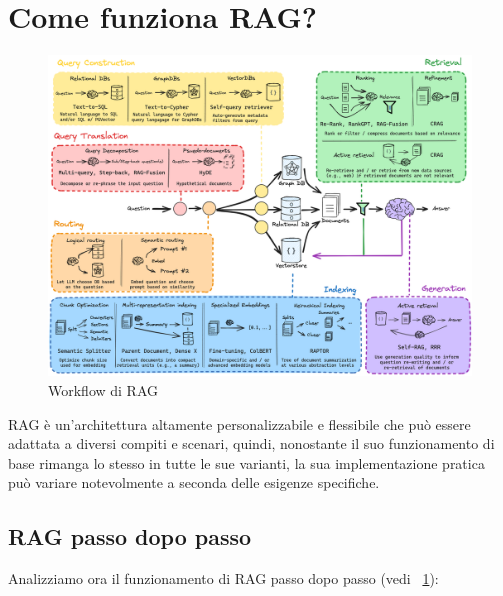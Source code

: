 \section{Come funziona RAG?}
\begin{figure}[!t]
    \centering
    \includegraphics[width=\textwidth]{Images/cap2/rag_workflow.png}
    \caption{Workflow di RAG \cite{ragworkflow}}
    \label{fig:rag_workflow}
\end{figure}
RAG è un'architettura altamente personalizzabile e flessibile che può essere adattata a diversi compiti e scenari, quindi, nonostante il suo funzionamento di base rimanga lo stesso in tutte le sue varianti, la sua implementazione pratica può variare notevolmente a seconda delle esigenze specifiche.

\subsection{RAG passo dopo passo}
Analizziamo ora il funzionamento di RAG passo dopo passo (vedi \figurename{~\ref{fig:rag_workflow}}):


